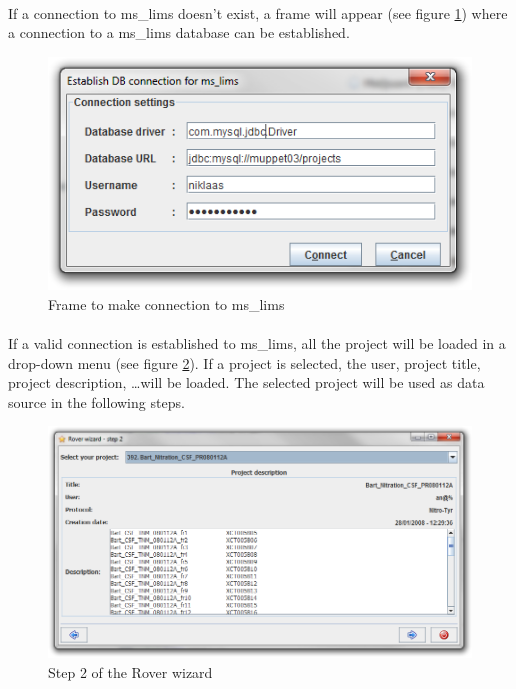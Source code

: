 \documentclass[11pt,a4paper,oneside,notitlepage]{book}
\begin{document}
\paragraph{}If a connection to ms\_lims doesn't exist, a frame will appear (see figure \ref{wizardDb}) where a connection to a ms\_lims database can be established.

\begin{figure}[H]
\begin{center}
\includegraphics[scale=0.4]{wizardDb.png}
\caption{Frame to make connection to ms\_lims}
\label{wizardDb}
\end{center}
\end{figure}

\paragraph{}If a valid connection is established to ms\_lims, all the project will be loaded in a drop-down menu (see figure \ref{step2B}). If a project is selected, the user, project title, project description, \ldots will be loaded. The selected project will be used as data source in the following steps.

\begin{figure}[H]
\begin{center}
\includegraphics[scale=0.4]{Rover_wizard_-_step_2_DB.png}
\caption{Step 2 of the Rover wizard}
\label{step2B}
\end{center}
\end{figure}
\end{document}
